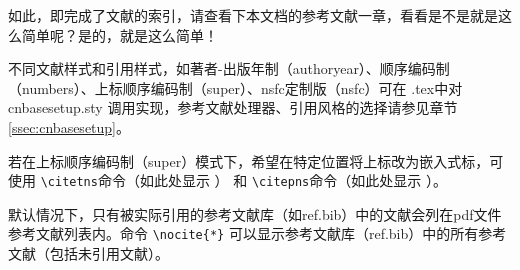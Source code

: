 如此，即完成了文献的索引，请查看下本文档的参考文献一章，看看是不是就是这么简单呢？是的，就是这么简单！

不同文献样式和引用样式，如著者-出版年制（authoryear）、顺序编码制（numbers）、上标顺序编码制（super）、nsfc定制版（nsfc）可在 \projectname.tex中对 cnbasesetup.sty 调用实现，参考文献处理器、引用风格的选择请参见章节\ref{ssec:cnbasesetup}。

若在上标顺序编码制（super）模式下，希望在特定位置将上标改为嵌入式标，可使用 \verb|\citetns|命令（如此处显示 ） 和 \verb|\citepns|命令（如此处显示 ）。



默认情况下，只有被实际引用的参考文献库（如ref.bib）中的文献会列在pdf文件参考文献列表内。命令 \verb|\nocite{*}| 可以显示参考文献库（ref.bib）中的所有参考文献（包括未引用文献）。